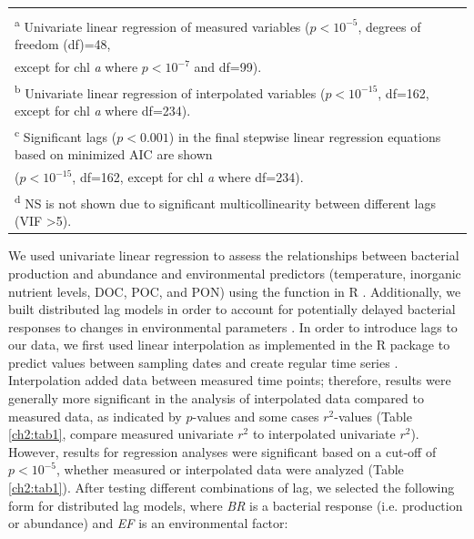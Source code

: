 {\begin{landscape}
\begin{table}[htbp]
\begin{tabular}{@{}lllll@{}}
                                  &                                                     &                                                        &                                              &                      \\
\multicolumn{5}{l}{\textsuperscript{a} Univariate linear regression of measured variables ($p<10^{-5}$, degrees of freedom (df)=48,}                                                 \\
\multicolumn{5}{l}{except for chl \emph{a} where $p<10^{-7}$ and df=99).}                                                                                                         \\
\multicolumn{5}{l}{\textsuperscript{b} Univariate linear regression of interpolated variables ($p<10^{-15}$, df=162, except for chl \emph{a} where df=234).}                       \\
\multicolumn{5}{l}{\textsuperscript{c} Significant lags ($p<0.001$) in the final stepwise linear regression equations based on minimized AIC are shown}                              \\
\multicolumn{4}{l}{($p<10^{-15}$, df=162, except for chl \emph{a} where df=234).}                                                                                &                \\
\multicolumn{5}{l}{\textsuperscript{d} NS is not shown due to significant multicollinearity between different lags (VIF \textgreater 5).}                                                                                
\end{tabular}
\end{table}
\end{landscape}
}

We used univariate linear regression to assess the relationships between bacterial production and abundance and environmental predictors (temperature, inorganic nutrient levels, DOC, POC, and PON) using the  function in R \citep{t08}. Additionally, we built distributed lag models in order to account for potentially delayed bacterial responses to changes in environmental parameters \citep{jorgenson1966rational}. In order to introduce lags to our data, we first used linear interpolation as implemented in the R package  to predict values between sampling dates and create regular time series \citep{zeileis2005zoo}. Interpolation added data between measured time points; therefore, results were generally more significant in the analysis of interpolated data compared to measured data, as indicated by $p$-values and some cases $r^2$-values (Table \ref{ch2:tab1}, compare measured univariate $r^2$ to interpolated univariate $r^2$). However, results for regression analyses were significant based on a cut-off of $p<10^{-5}$, whether measured or interpolated data were analyzed (Table \ref{ch2:tab1}). After testing different combinations of lag, we selected the following form for distributed lag models, where \emph{BR} is a bacterial response (i.e. production or abundance) and \emph{EF} is an environmental factor:

